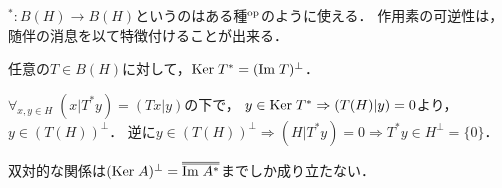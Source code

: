 \documentclass[uplatex,dvipdfmx]{jsreport}
\begin{document}
\begin{tcolorbox}[colframe=ForestGreen, colback=ForestGreen!10!white,breakable,colbacktitle=ForestGreen!40!white,coltitle=black,fonttitle=\bfseries\sffamily,
title=]
    ${}^*:B(H)\to B(H)$というのはある種${}^{\mathrm{op}}$のように使える．
    作用素の可逆性は，随伴の消息を以て特徴付けることが出来る．
\end{tcolorbox}

\begin{proposition}\label{prop-Ker-of-adjoint-operator}
    任意の$T\in B(H)$に対して，$\mathrm{Ker}\; T^*=(\mathrm{Im}\; T)^\perp$．
\end{proposition}
\begin{Proof}
    $\forall_{x,y\in H}\;(x|T^*y)=(Tx|y)$の下で，
    $y\in\mathrm{Ker}\; T^*\Rightarrow (T(H)|y)=0$より，$y\in(T(H))^\perp$．
    逆に$y\in(T(H))^\perp\Rightarrow (H|T^*y)=0\Rightarrow T^*y\in H^\perp=\{0\}$．
\end{Proof}
\begin{remark}
    双対的な関係は$(\Ker A)^\perp=\oo{\Im A^*}$までしか成り立たない．
\end{remark}
\end{document}
